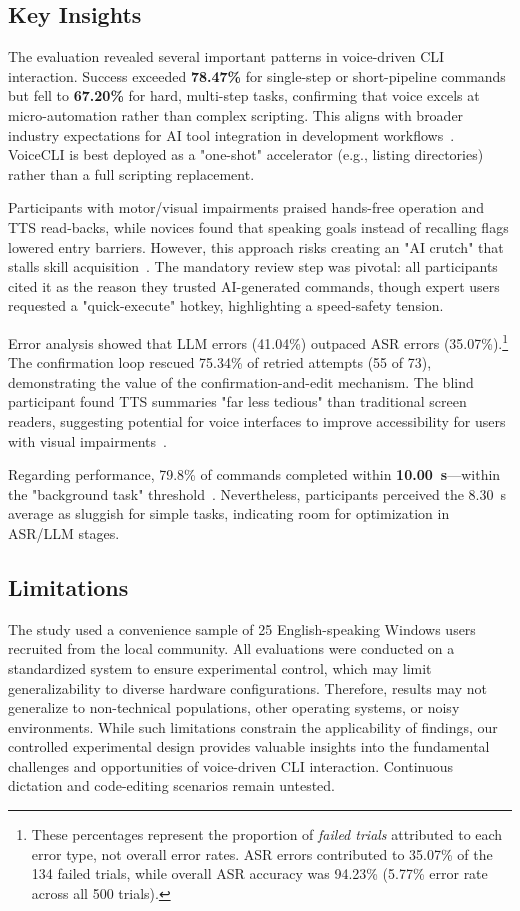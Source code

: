 \documentclass[a4paper,12pt]{article}
\begin{document}
\subsection{Key Insights}

The evaluation revealed several important patterns in voice-driven CLI interaction. Success exceeded \textbf{78.47\%} for single-step or short-pipeline commands but fell to \textbf{67.20\%} for hard, multi-step tasks, confirming that voice excels at micro-automation rather than complex scripting. This aligns with broader industry expectations for AI tool integration in development workflows~\cite{ref2}. VoiceCLI is best deployed as a "one-shot" accelerator (e.g., listing directories) rather than a full scripting replacement.

Participants with motor/visual impairments praised hands-free operation and TTS read-backs, while novices found that speaking goals instead of recalling flags lowered entry barriers. However, this approach risks creating an "AI crutch" that stalls skill acquisition~\cite{ref5,ref4}. The mandatory review step was pivotal: all participants cited it as the reason they trusted AI-generated commands, though expert users requested a "quick-execute" hotkey, highlighting a speed-safety tension.

Error analysis showed that LLM errors (41.04\%) outpaced ASR errors (35.07\%).\footnote{These percentages represent the proportion of \textit{failed trials} attributed to each error type, not overall error rates. ASR errors contributed to 35.07\% of the 134 failed trials, while overall ASR accuracy was 94.23\% (5.77\% error rate across all 500 trials).} The confirmation loop rescued 75.34\% of retried attempts (55 of 73), demonstrating the value of the confirmation-and-edit mechanism. The blind participant found TTS summaries "far less tedious" than traditional screen readers, suggesting potential for voice interfaces to improve accessibility for users with visual impairments~\cite{ref28}.

Regarding performance, 79.8\% of commands completed within \textbf{10.00~s}—within the "background task" threshold~\cite{ref4}. Nevertheless, participants perceived the 8.30~s average as sluggish for simple tasks, indicating room for optimization in ASR/LLM stages.  

\subsection{Limitations}  
The study used a convenience sample of 25 English-speaking Windows users recruited from the local community. All evaluations were conducted on a standardized system to ensure experimental control, which may limit generalizability to diverse hardware configurations. Therefore, results may not generalize to non-technical populations, other operating systems, or noisy environments. While such limitations constrain the applicability of findings, our controlled experimental design provides valuable insights into the fundamental challenges and opportunities of voice-driven CLI interaction. Continuous dictation and code-editing scenarios remain untested.  
\end{document}
